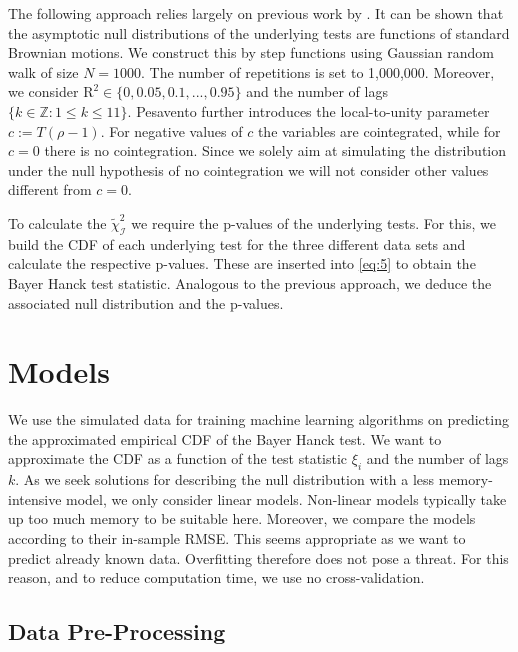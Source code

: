 \documentclass[12pt,a4paper]{article}
\begin{document}
The following approach relies largely on previous work by
\textcite{Pesavento_2004}. It can be shown that the asymptotic null
distributions of the underlying tests are functions of standard Brownian
motions. We construct this by step functions using Gaussian random walk
of size \(N = 1000\). The number of repetitions is set to 1,000,000.
Moreover, we consider \(\text{R}^2 \in \{0, 0.05, 0.1, ..., 0.95\}\) and
the number of lags \(\{k \in \mathbb{Z}: 1 \leq k \leq 11\}\). Pesavento
further introduces the local-to-unity parameter \(c:= T(\rho-1)\). For
negative values of \(c\) the variables are cointegrated, while for
\(c = 0\) there is no cointegration. Since we solely aim at simulating
the distribution under the null hypothesis of no cointegration we will
not consider other values different from \(c = 0\).

To calculate the \(\tilde{\chi}^2_{\mathcal{I}}\) we require the
p-values of the underlying tests. For this, we build the \ac{CDF} of
each underlying test for the three different data sets and calculate the
respective p-values. These are inserted into \eqref{eq:5} to obtain the
Bayer Hanck test statistic. Analogous to the previous approach, we
deduce the associated null distribution and the p-values.

\hypertarget{models}{%
\section{Models}\label{models}}

We use the simulated data for training machine learning algorithms on
predicting the approximated empirical \ac{CDF} of the Bayer Hanck test.
We want to approximate the \ac{CDF} as a function of the test statistic
\(\xi_i\) and the number of lags \(k\). As we seek solutions for
describing the null distribution with a less memory-intensive model, we
only consider linear models. Non-linear models typically take up too
much memory to be suitable here. Moreover, we compare the models
according to their in-sample \ac{RMSE}. This seems appropriate as we
want to predict already known data. Overfitting therefore does not pose
a threat. For this reason, and to reduce computation time, we use no
cross-validation.

\hypertarget{data-pre-processing}{%
\subsection{Data Pre-Processing}\label{data-pre-processing}}
\end{document}
